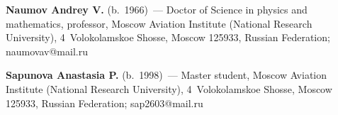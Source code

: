 \vspace*{3pt}

\noindent
\textbf{Naumov Andrey V.} (b.\ 1966)~--- Doctor of Science in physics and mathematics, 
professor, Moscow Aviation Institute (National Research University), 4~Volokolamskoe Shosse, 
Moscow 125933, Russian Federation; \mbox{naumovav@mail.ru}

\vspace*{3pt}

\noindent
\textbf{Sapunova Anastasia P.} (b.\ 1998)~--- Master student, Moscow Aviation Institute 
(National Research University), 4~Volokolamskoe Shosse, Moscow 125933, Russian 
Federation; \mbox{sap2603@mail.ru}

\label{end\stat}

\renewcommand{\bibname}{\protect\rm Литература} 